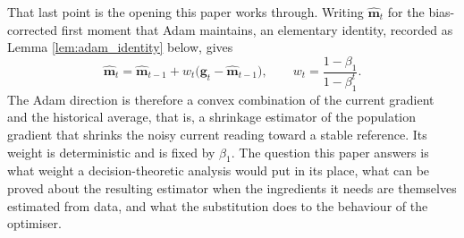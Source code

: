 \documentclass[a4paper,fleqn]{cas-sc}
\theoremstyle{plain}
\theoremstyle{definition}
\theoremstyle{remark}
\begin{document}
That last point is the opening this paper works through. Writing $\hat{\bm m}_t$ for the bias-corrected first moment that Adam maintains, an elementary identity, recorded as Lemma \ref{lem:adam_identity} below, gives
\begin{equation}
\label{eq:adam_convex}
\hat{\bm m}_t
=
\hat{\bm m}_{t-1}
+
w_t\bigl(\bm g_t-\hat{\bm m}_{t-1}\bigr),
\qquad
w_t=\frac{1-\beta_1}{1-\beta_1^{t}} .
\end{equation}
The Adam direction is therefore a convex combination of the current gradient and the historical average, that is, a shrinkage estimator of the population gradient that shrinks the noisy current reading toward a stable reference. Its weight is deterministic and is fixed by $\beta_1$. The question this paper answers is what weight a decision-theoretic analysis would put in its place, what can be proved about the resulting estimator when the ingredients it needs are themselves estimated from data, and what the substitution does to the behaviour of the optimiser.
\end{document}
